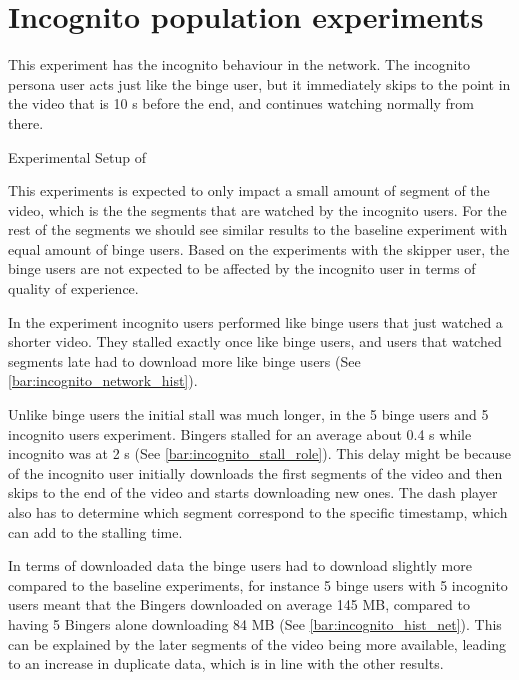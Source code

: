 
 
\FloatBarrier \section{Incognito population experiments}
\label{sec:eval_incognito}
This experiment has the incognito behaviour in the network.
The incognito persona user acts just like the binge user, but it immediately skips to the point in the video that is 10 \ac{s} before the end, and continues watching normally from there.

\begin{table}[!htbp]
    \myfloatalign
    \caption[Experimental Setup of Incognito]{Experimental Setup of }
    \label{tab:exp_overview_incognito}
    
\end{table}

This experiments is expected to only impact a small amount of segment of the video, which is the the segments that are watched by the incognito users.
For the rest of the segments we should see similar results to the baseline experiment with equal amount of binge users. Based on the experiments with the skipper user, the binge users are not expected to be affected by the incognito user in terms of quality of experience.

In the experiment incognito users performed like binge users that just watched a shorter video. They stalled exactly once like binge users, and users that watched segments late had to download more like binge users (See \autoref{bar:incognito_network_hist}). 



Unlike binge users the initial stall was much longer, in the 5 binge users and 5 incognito users experiment. Bingers stalled for an average about 0.4 \ac{s} while incognito was at 2 \ac{s} (See \autoref{bar:incognito_stall_role}). This delay might be because of the incognito user initially downloads the first segments of the video and then skips to the end of the video and starts downloading new ones. The dash player also has to determine which segment correspond to the specific timestamp, which can add to the stalling time.



In terms of downloaded data the binge users had to download slightly more compared to the baseline experiments, for instance 5 binge users with 5 incognito users meant that the Bingers downloaded on average 145 \ac{MB}, compared to having 5 Bingers alone downloading 84 \ac{MB} (See \autoref{bar:incognito_hist_net}). This can be explained by the later segments of the video being more available, leading to an increase in duplicate data, which is in line with the other results.

